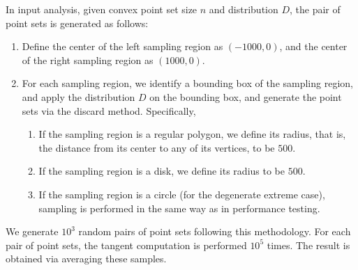 \documentclass{article}
\begin{document}
\begin{appendices}
    In input analysis, given convex point set size $n$ and distribution $D$, the pair of point sets is generated as follows:
    \begin{enumerate}
        \item Define the center of the left sampling region as $(-1000, 0)$, and the center of the right sampling region as $(1000, 0)$.
        \item For each sampling region, we identify a bounding box of the sampling region, and apply the distribution $D$ on the bounding box, and generate the point sets via the discard method. Specifically,
        \begin{enumerate}
            \item If the sampling region is a regular polygon, we define its radius, that is, the distance from its center to any of its vertices, to be $500$.
            \item If the sampling region is a disk, we define its radius to be $500$.
            \item If the sampling region is a circle (for the degenerate extreme case), sampling is performed in the same way as in performance testing.
        \end{enumerate}
    \end{enumerate}
    We generate $10^3$ random pairs of point sets following this methodology. For each pair of point sets, the tangent computation is performed $10^5$ times. The result is obtained via averaging these samples.
\end{appendices}
\end{document}
